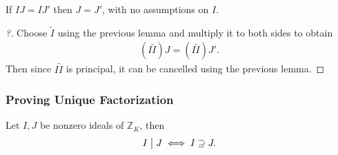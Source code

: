 \begin{proposition}

If \(IJ = IJ'\) then \(J = J'\), with no assumptions on \(I\).

\end{proposition}

\begin{proof}[?]

Choose \(\tilde I\) using the previous lemma and multiply it to both
sides to obtain
\begin{align*}
(I \tilde I) J = (I \tilde I) J'
.\end{align*}
Then since \(I\tilde I\) is principal, it can be cancelled using the
previous lemma.

\end{proof}

\hypertarget{proving-unique-factorization}{%
\subsubsection{Proving Unique
Factorization}\label{proving-unique-factorization}}

\begin{theorem}

Let \(I, J\) be nonzero ideals of \({\mathbb{Z}}_K\), then
\begin{align*}
I \bigm|J \iff I \supseteq J
.\end{align*}

\end{theorem}

